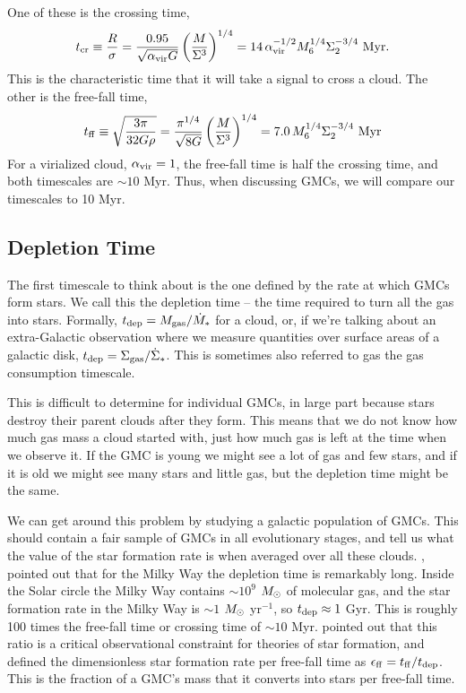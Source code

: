 One of these is the crossing time,
\begin{equation}
t_{\rm cr} \equiv \frac{R}{\sigma} = \frac{0.95}{\sqrt{\alpha_{\mathrm{vir}} G}} \left(\frac{M}{\Sigma^3}\right)^{1/4} = 14\, \alpha_{\mathrm{vir}}^{-1/2} M_6^{1/4} \Sigma_2^{-3/4}\mbox{ Myr}.
\end{equation}
This is the characteristic time that it will take a signal to cross a cloud. The other is the free-fall time,
\begin{equation}
t_{\rm ff} \equiv \sqrt{\frac{3\pi}{32 G \rho}} = \frac{\pi^{1/4}}{\sqrt{8G}}\left(\frac{M}{\Sigma^3}\right)^{1/4} = 
7.0\, M_6^{1/4} \Sigma_2^{-3/4}\mbox{ Myr}
\end{equation}
For a virialized cloud, $\alpha_{\mathrm{vir}}=1$, the free-fall time is half the crossing time, and both timescales are $\sim 10$ Myr. Thus, when discussing GMCs, we will compare our timescales to 10 Myr.

\subsection{Depletion Time}

The first timescale to think about is the one defined by the rate at which GMCs form stars. We call this the depletion time -- the time required to turn all the gas into stars. Formally, $t_{\rm dep} = M_{\rm gas}/\dot{M}_*$ for a cloud, or, if we're talking about an extra-Galactic observation where we measure quantities over surface areas of a galactic disk, $t_{\rm dep} = \Sigma_{\rm gas}/\dot{\Sigma}_*$. This is sometimes also referred to gas the gas consumption timescale.

This is difficult to determine for individual GMCs, in large part because stars destroy their parent clouds after they form. This means that we do not know how much gas mass a cloud started with, just how much gas is left at the time when we observe it. If the GMC is young we might see a lot of gas and few stars, and if it is old we might see many stars and little gas, but the depletion time might be the same.

We can get around this problem by studying a galactic population of GMCs. This should contain a fair sample of GMCs in all evolutionary stages, and tell us what the value of the star formation rate is when averaged over all these clouds. \citet{zuckerman74a}, pointed out that for the Milky Way the depletion time is remarkably long. Inside the Solar circle the Milky Way contains $\sim 10^9$ $M_{\odot}$ of molecular gas, and the star formation rate in the Milky Way is $\sim 1$ $M_{\odot}$ yr$^{-1}$, so $t_{\rm dep}\approx 1$ Gyr. This is roughly 100 times the free-fall time or crossing time of $\sim 10$ Myr. \citet{krumholz05c} pointed out that this ratio is a critical observational constraint for theories of star formation, and defined the dimensionless star formation rate per free-fall time as $\epsilon_{\rm ff} = t_{\rm ff} / t_{\rm dep}$. This is the fraction of a GMC's mass that it converts into stars per free-fall time.

